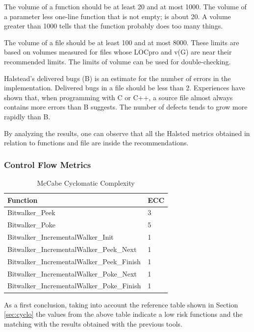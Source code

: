 The volume of a function should be at least 20 and at most 1000. The volume of a parameter less one-line function that is not empty; is about 20. A volume greater than 1000 tells that the function probably does too many things.

The volume of a file should be at least 100 and at most 8000. These limits are based on volumes measured for files whose LOCpro and v(G) are near their recommended limits. The limits of volume can be used for double-checking.

Halstead's delivered bugs (B) is an estimate for the number of errors in the implementation.
Delivered bugs in a file should be less than 2. Experiences have shown that, when programming with C or C++, a source file almost always contains more errors than B suggests. The number of defects tends to grow more rapidly than B.

By analyzing the results, one can observe that all the Halsted metrics obtained in relation to functions and file are inside the recommendations.


\subsubsection{Control Flow Metrics}
\begin{longtable}{||p{}|p{}||}
  \caption{McCabe Cyclomatic Complexity}\\
    \hline\hline
    \textbf{Function} &\textbf{ECC}\\
    \hline\hline
    \endhead
    \hline\hline
    \endfoot
    Bitwalker\_Peek & 3  
    \\
    \hline
    Bitwalker\_Poke & 5  
    \\
    \hline
    Bitwalker\_IncrementalWalker\_Init & 1
    \\
    \hline
    Bitwalker\_IncrementalWalker\_Peek\_Next & 1  
    \\
    \hline
    Bitwalker\_IncrementalWalker\_Peek\_Finish & 1  
    \\
    \hline
    Bitwalker\_IncrementalWalker\_Poke\_Next & 1  
    \\
    \hline
    Bitwalker\_IncrementalWalker\_Poke\_Finish & 1  
    \\
    \hline
   \end{longtable}

As a first conclusion, taking into account the reference table shown in Section \ref{sec:cyclo} the values from the above table indicate a low risk functions and the matching with the results obtained with the previous tools.


